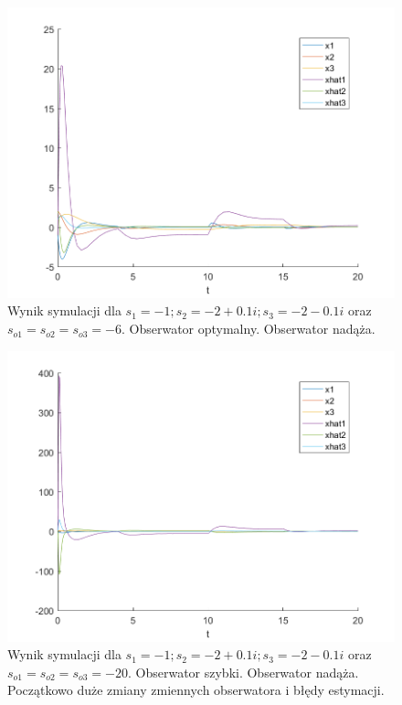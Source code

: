 \documentclass{article}
\begin{document}
\begin{figure}[H]
\centering
\includegraphics[width=0.9\linewidth]{z8_-6}
\caption{Wynik symulacji dla $s_1 = -1; s_2 = -2 + 0.1i; s_3 = -2 -0.1i$ oraz $s_{o1}=s_{o2}=s_{o3} = -6$. Obserwator optymalny. Obserwator nadąża.}
\label{fig:z8_2-6}
\end{figure}

\begin{figure}[H]
\centering
\includegraphics[width=0.9\linewidth]{z8_-20}
\caption{Wynik symulacji dla  $s_1 = -1; s_2 = -2 + 0.1i; s_3 = -2 -0.1i$ oraz $s_{o1}=s_{o2}=s_{o3} = -20$. Obserwator szybki. Obserwator nadąża. Początkowo duże zmiany zmiennych obserwatora i błędy estymacji.}
\label{fig:z8_2-20}
\end{figure}
\end{document}
